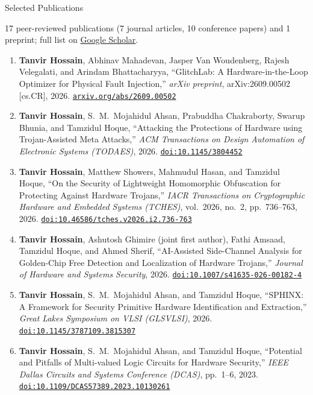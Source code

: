 \begin{rSection}{Selected Publications}
\newcommand{\doi}[1]{\href{https://doi.org/#1}{\nolinkurl{doi:#1}}}

{\small 17 peer-reviewed publications (7 journal articles, 10 conference papers) and 1 preprint; full list on \href{https://scholar.google.com/citations?user=lPEOU2wAAAAJ&hl=en}{Google Scholar}.}

\begin{enumerate}[itemsep=0.05em, leftmargin=1.5em, topsep=0.2em, font=\color{accent}\bfseries]
\small
    \item \textbf{Tanvir Hossain}, Abhinav Mahadevan, Jasper Van Woudenberg, Rajesh Velegalati, and Arindam Bhattacharyya, ``GlitchLab: A Hardware-in-the-Loop Optimizer for Physical Fault Injection,'' \emph{arXiv preprint}, arXiv:2609.00502 [cs.CR], 2026. \href{https://arxiv.org/abs/2609.00502}{\nolinkurl{arxiv.org/abs/2609.00502}}

    \item \textbf{Tanvir Hossain}, S.\ M.\ Mojahidul Ahsan, Prabuddha Chakraborty, Swarup Bhunia, and Tamzidul Hoque, ``Attacking the Protections of Hardware using Trojan-Assisted Meta Attacks,'' \emph{ACM Transactions on Design Automation of Electronic Systems (TODAES)}, 2026. \doi{10.1145/3804452}

    \item \textbf{Tanvir Hossain}, Matthew Showers, Mahmudul Hasan, and Tamzidul Hoque, ``On the Security of Lightweight Homomorphic Obfuscation for Protecting Against Hardware Trojans,'' \emph{IACR Transactions on Cryptographic Hardware and Embedded Systems (TCHES)}, vol.\ 2026, no.\ 2, pp.\ 736--763, 2026. \doi{10.46586/tches.v2026.i2.736-763}

    \item \textbf{Tanvir Hossain}, Ashutosh Ghimire (joint first author), Fathi Amsaad, Tamzidul Hoque, and Ahmed Sherif, ``AI-Assisted Side-Channel Analysis for Golden-Chip Free Detection and Localization of Hardware Trojans,'' \emph{Journal of Hardware and Systems Security}, 2026. \doi{10.1007/s41635-026-00182-4}

    \item \textbf{Tanvir Hossain}, S.\ M.\ Mojahidul Ahsan, and Tamzidul Hoque, ``SPHINX: A Framework for Security Primitive Hardware Identification and Extraction,'' \emph{Great Lakes Symposium on VLSI (GLSVLSI)}, 2026. \doi{10.1145/3787109.3815307}

    \item \textbf{Tanvir Hossain}, S.\ M.\ Mojahidul Ahsan, and Tamzidul Hoque, ``Potential and Pitfalls of Multi-valued Logic Circuits for Hardware Security,'' \emph{IEEE Dallas Circuits and Systems Conference (DCAS)}, pp.\ 1--6, 2023. \doi{10.1109/DCAS57389.2023.10130261}


\end{enumerate}
\end{rSection}
